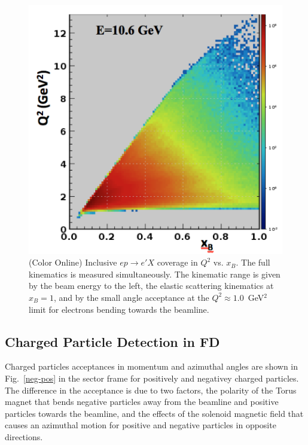 \documentclass[final,3p,twocolumn]{elsarticle}
\begin{document}
\begin{figure}[htbp!]
\centerline{\includegraphics[width=1.0\columnwidth]{e-inclusive.png}}
\caption{(Color Online) Inclusive $ep \to e'X$ coverage in $Q^2$ vs. $x_B$. The full kinematics is measured simultaneously. The
kinematic range is given by the beam energy to the left, the elastic scattering kinematics at $x_B = 1$, and by the
small angle acceptance at the $Q^2 \approx 1.0$~GeV$^2$ limit for electrons bending towards the beamline.} 
\label{electron-acceptance}
\end{figure}

\subsection{Charged Particle Detection in FD}
 
Charged particles acceptances in momentum and azimuthal angles are shown in Fig.~\ref{neg-pos} in the sector
frame for positively and negativey charged particles. The difference in the acceptance is due to two factors, the
polarity of the Torus magnet that bends negative particles away from the beamline and positive particles towards
the beamline, and the effects of the solenoid magnetic field that causes an azimuthal motion for positive and negative
particles in opposite directions. 
\end{document}
